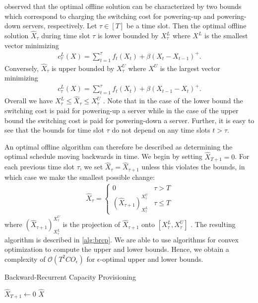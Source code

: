 \citeauthor*{Lin2011} observed that the optimal offline solution can be characterized by two bounds which correspond to charging the switching cost for powering-up and powering-down servers, respectively. Let $\tau \in [T]$ be a time slot. Then the optimal offline solution $\hat{X}_{\tau}$ during time slot $\tau$ is lower bounded by $X_{\tau}^L$ where $X^L$ is the smallest vector minimizing \begin{align*}
    c_{\tau}^L(X) = \sum_{t=1}^{\tau} f_t(X_t) + \beta (X_t - X_{t-1})^+.
\end{align*} Conversely, $\hat{X}_{\tau}$ is upper bounded by $X_{\tau}^U$ where $X^U$ is the largest vector minimizing \begin{align*}
    c_{\tau}^L(X) = \sum_{t=1}^{\tau} f_t(X_t) + \beta (X_{t-1} - X_t)^+.
\end{align*} Overall we have $X_{\tau}^L \leq \hat{X}_{\tau} \leq X_{\tau}^U$ \cite{Lin2011}. Note that in the case of the lower bound the switching cost is paid for powering-up a server while in the case of the upper bound the switching cost is paid for powering-down a server. Further, it is easy to see that the bounds for time slot $\tau$ do not depend on any time slots $t > \tau$.

An optimal offline algorithm can therefore be described as determining the optimal schedule moving backwards in time. We begin by setting $\hat{X}_{T+1} = 0$. For each previous time slot $\tau$, we set $\hat{X}_{\tau} = \hat{X}_{\tau + 1}$ unless this violates the bounds, in which case we make the smallest possible change: \begin{align*}
    \hat{X}_{\tau} = \begin{cases}
        0 & \tau > T \\
        (\hat{X}_{\tau+1})_{X_{\tau}^L}^{X_{\tau}^U} & \tau \leq T
    \end{cases}
\end{align*} where $(\hat{X}_{\tau+1})_{X_{\tau}^L}^{X_{\tau}^U}$ is the projection of $\hat{X}_{\tau+1}$ onto $[X_{\tau}^L, X_{\tau}^U]$ \cite{Lin2011}. The resulting algorithm is described in \autoref{alg:brcp}. We are able to use algorithms for convex optimization to compute the upper and lower bounds. Hence, we obtain a complexity of $\mathcal{O}(T^2 C O_{\epsilon})$ for $\epsilon$-optimal upper and lower bounds.

\begin{algorithm}
    \caption{Backward-Recurrent Capacity Provisioning \cite{Lin2011}}\label{alg:brcp}
    $\hat{X}_{T+1} \gets 0$\;
    \Return $\hat{X}$\;
\end{algorithm}

